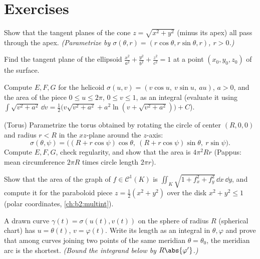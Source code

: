 \section{Exercises}

\begin{exercise}[$\star$]\label{exo:b2:surfaces:1}
Show that the tangent planes of the cone $z = \sqrt{x^2 + y^2}$
(minus its apex) all pass through the apex. \emph{(Parametrize by
$\sigma(\theta, r) = (r\cos\theta, r\sin\theta, r)$, $r > 0$.)}
\end{exercise}

\begin{exercise}[$\star$]\label{exo:b2:surfaces:2}
Find the tangent plane of the ellipsoid $\frac{x^2}{a^2} +
\frac{y^2}{b^2} + \frac{z^2}{c^2} = 1$ at a point $(x_0, y_0,
z_0)$ of the surface.
\end{exercise}

\begin{exercise}[$\star$]\label{exo:b2:surfaces:3}
Compute $E, F, G$ for the helicoid $\sigma(u, v) = (v\cos u,\
v\sin u,\ au)$, $a > 0$, and the area of the piece $0 \leq u \leq
2\pi$, $0 \leq v \leq 1$, as an integral (evaluate it using
$\int\sqrt{v^2 + a^2}\,\dd v = \frac12\bigl(v\sqrt{v^2+a^2} +
a^2\ln(v + \sqrt{v^2 + a^2})\bigr) + C$).
\end{exercise}

\begin{exercise}[$\star\star$]\label{exo:b2:surfaces:4}
(Torus) Parametrize the torus obtained by rotating the circle of
center $(R, 0, 0)$ and radius $r < R$ in the $xz$-plane around the
$z$-axis:
\[
\sigma(\theta, \psi) = \bigl((R + r\cos\psi)\cos\theta,\
(R + r\cos\psi)\sin\theta,\ r\sin\psi\bigr).
\]
Compute $E, F, G$, check regularity, and show that the area is
$4\pi^2 R r$ (Pappus: mean circumference $2\pi R$ times circle
length $2\pi r$).
\end{exercise}

\begin{exercise}[$\star\star$]\label{exo:b2:surfaces:5}
Show that the area of the graph of $f \in \mathcal{C}^1(K)$ is
$\iint_K \sqrt{1 + f_x^2 + f_y^2}\,\dd x\,\dd y$, and compute it
for the paraboloid piece $z = \frac12(x^2 + y^2)$ over the disk
$x^2 + y^2 \leq 1$ (polar coordinates,
\cref{ch:b2:multint}).
\end{exercise}

\begin{exercise}[$\star\star$]\label{exo:b2:surfaces:6}
A drawn curve $\gamma(t) = \sigma(u(t), v(t))$ on the sphere of
radius $R$ (spherical chart) has $u = \theta(t)$, $v =
\varphi(t)$. Write its length as an integral in $\theta, \varphi$
and prove that among curves joining two points of the same
meridian $\theta = \theta_0$, the meridian arc is the shortest.
\emph{(Bound the integrand below by $R\abs{\varphi'}$.)}
\end{exercise}

